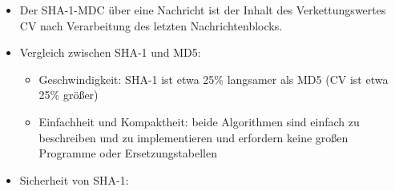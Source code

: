 \documentclass[a4paper]{article}
\begin{document}
\begin{multicols}{3}
\begin{itemize}
              \begin{itemize}
                  \item
                        \$t\textbackslash in\{0,...,15\}\textbackslash Rightarrow W\_t:=
                        y\_i{[}t{]}\$
                  \item
                        \$t\textbackslash in\{16,...,79\}\textbackslash Rightarrow
                        W\_t:=CLS\_1(W\_\{t-16\}\textbackslash oplus
                        W\_\{t-14\}\textbackslash oplus W\_\{t-8\} \textbackslash oplus
                        W\_\{t-3\})\$
                  \item
                        Nach Schritt 79 wird jedes Register A, B, C, D, E modulo
                        \$2\^{}\{32\}\$ mit dem Wert des entsprechenden Registers vor
                        Schritt 0 addiert, um \$CV\_\{i+1\}\$ zu berechnen
              \end{itemize}
        \item
              Der SHA-1-MDC über eine Nachricht ist der Inhalt des Verkettungswertes
              CV nach Verarbeitung des letzten Nachrichtenblocks.
        \item
              Vergleich zwischen SHA-1 und MD5:

              \begin{itemize}
                  \item
                        Geschwindigkeit: SHA-1 ist etwa 25\% langsamer als MD5 (CV ist etwa
                        25\% größer)
                  \item
                        Einfachheit und Kompaktheit: beide Algorithmen sind einfach zu
                        beschreiben und zu implementieren und erfordern keine großen
                        Programme oder Ersetzungstabellen
              \end{itemize}
        \item
              Sicherheit von SHA-1:


\end{itemize}
\end{multicols}
\end{document}
